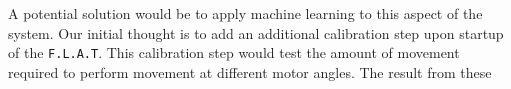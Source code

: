 A potential solution would be to apply machine learning to this aspect of the system.
Our initial thought is to add an additional calibration step upon startup of the \texttt{F.L.A.T}.
This calibration step would test the amount of movement required to perform movement at different motor angles.
The result from these 


